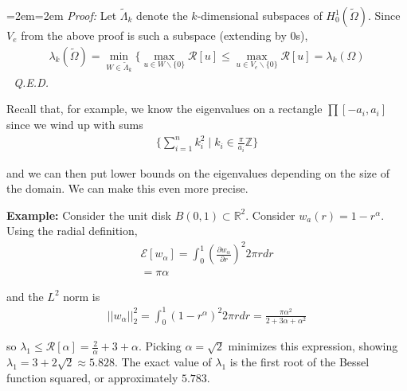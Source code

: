 \documentclass{article}
\newcommand{\R}{{\mathbb{R}}}
\newcommand{\Z}{{\mathbb{Z}}}
\newcommand{ \norm }[1]{{ || {#1}||}}
\newcommand{\pd}{\partial}
\newenvironment{pf}{%
	\par%
	\medskip
	\leftskip=2em\rightskip=2em%
	\noindent\ignorespaces \textit{Proof:} \newline}{%
	\,\, \newline \textit{Q.E.D.}\par\medskip}
\begin{document}
	\begin{pf}
		Let $\tilde{\Lambda}_{k} $ denote the $k$-dimensional subspaces of $H^{1}_{0}(\tilde{\Omega})$. Since $V_{e}$ from the above proof is such a subspace (extending by 0s),
		\begin{align*}
			\lambda_{k}(\tilde{\Omega}) = \min_{W \in \tilde{\Lambda}_{k}} \{ \max_{u \in W \backslash \{0\}} \mathcal{R}[u] \leq \max_{u \in V_{e} \backslash \{0\}} \mathcal{R}[u] = \lambda_{k}(\Omega)
		\end{align*}
	\end{pf}
	
	Recall that, for example, we know the eigenvalues on a rectangle $\prod [-a_i,a_i]$ since we wind up with sums 
	\begin{align*}
		\{\sum_{i=1}^{n} k_{i}^{2} \mid k_i \in \frac{\pi}{a_i}\Z\}
	\end{align*} 
	
	and we can then put lower bounds on the eigenvalues depending on the size of the domain. We can make this even more precise.
	
	\vspace{1cm}
	\textbf{Example:} Consider the unit disk $B(0,1) \subset \R^{2}$. Consider $w_{a}(r) = 1-r^{\alpha}$. Using the radial definition,
	\begin{align*}
		\mathcal{E}[w_\alpha] = \int_{0}^{1} \left(\frac{\pd w_\alpha}{\pd r}\right)^{2} 2\pi r dr \\
		= \pi \alpha
	\end{align*}
	
	and the $L^{2}$ norm is 
	\begin{align*}
		\norm{w_\alpha}_{2}^{2} = \int_{0}^{1} (1-r^{\alpha})^{2}2\pi r dr = \frac{\pi \alpha^{2}}{2+3\alpha+\alpha^{2}}
	\end{align*}
	
	so $\lambda_{1} \leq \mathcal{R}[\alpha] = \frac{2}{\alpha} + 3 + \alpha$. Picking $\alpha = \sqrt{2}$ minimizes this expression, showing $\lambda_{1} = 3 + 2\sqrt{2} \approx 5.828$. The exact value of $\lambda_1$ is the first root of the Bessel function squared, or approximately $5.783$. 
	
	\vspace{1 cm}
	
\end{document}
